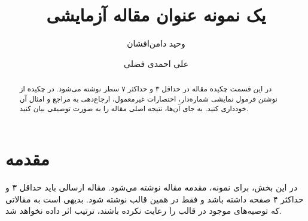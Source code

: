 \documentclass[aimcpersian]{aimc46}
\title{
یک نمونه عنوان مقاله آزمایشی
}
\author{
وحید دامن‌افشان%
\RTLthanks{سخنران}\index{دامن‌افشان، وحید}
\university{دانشگاه تبریز}
\and
علی احمدی فضلی
\index{احمدی فضلی، علی}\university{دانشگاه یزد}
}
\begin{document}
\maketitle

\begin{abstract}
در این قسمت چکیده مقاله در حداقل ۳ و حداکثر ۷
 سطر نوشته می‌شود. در چکیده از نوشتن فرمول نمایشی شماره‌دار، اختصارات غیرمعمول، ارجاع‌دهی به مراجع و امثال آن
 خودداری کنید. به جای آن‌ها، نتیجه اصلی مقاله را به صورت توصیفی بیان کنید.
\end{abstract}
\subject{13D45, 39B42}



\section{مقدمه }
در این بخش، برای نمونه، مقدمه مقاله نوشته می‌شود. مقاله ارسالی باید حداقل ۳ و حداکثر ۴ صفحه داشته باشد و فقط 
در همین قالب نوشته شود.  بدیهی است به مقالاتی که توصیه‌های موجود در قالب را رعایت نکرده باشند، ترتیب اثر داده نخواهد شد. 
\end{document}
